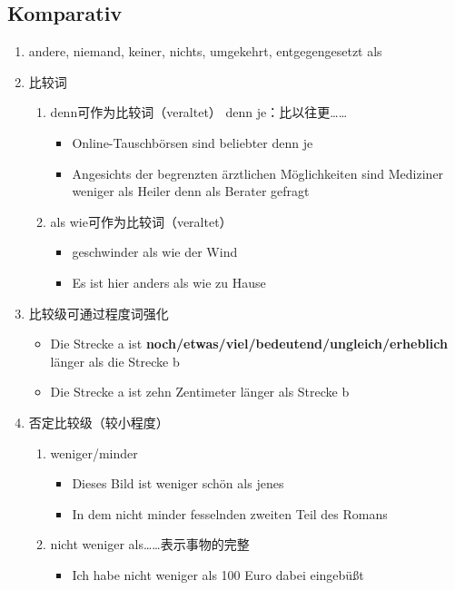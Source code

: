 \documentclass[UTF8]{report}
\begin{document}
\subsection{Komparativ}
\begin{enumerate}
    \item andere, niemand, keiner, nichts, umgekehrt, entgegengesetzt als
    \item 比较词
    \begin{enumerate}
        \item denn可作为比较词（veraltet） denn je：比以往更……
        \begin{itemize}
            \item Online-Tauschbörsen sind beliebter denn je
            \item Angesichts der begrenzten ärztlichen Möglichkeiten sind Mediziner weniger als Heiler denn als Berater gefragt
        \end{itemize}
        \item als wie可作为比较词（veraltet）
        \begin{itemize}
            \item geschwinder als wie der Wind
            \item Es ist hier anders als wie zu Hause
        \end{itemize}
    \end{enumerate}
    \item 比较级可通过程度词强化
    \begin{itemize}
        \item Die Strecke a ist \textbf{noch/etwas/viel/bedeutend/ungleich/erheblich} länger als die Strecke b
        \item Die Strecke a ist zehn Zentimeter länger als Strecke b
    \end{itemize}
    \item 否定比较级（较小程度）
    \begin{enumerate}
        \item weniger/minder
        \begin{itemize}
            \item Dieses Bild ist weniger schön als jenes
            \item In dem nicht minder fesselnden zweiten Teil des Romans
        \end{itemize}
        \item nicht weniger als……表示事物的完整
        \begin{itemize}
            \item Ich habe nicht weniger als 100 Euro dabei eingebüßt

\end{itemize}
\end{enumerate}
\end{enumerate}
\end{document}
